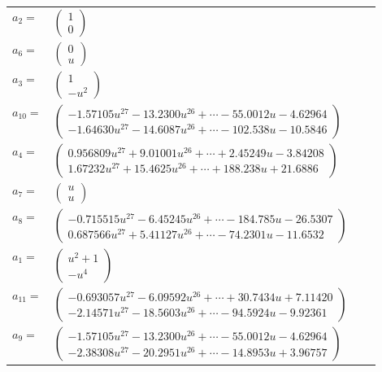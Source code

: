 \documentclass[1p]{elsarticle_modified}
\theoremstyle{definition}
\begin{document}
\begin{tabular}{m{7pt} m{180pt} m{7pt} m{180pt} }
\flushright $a_{2}=$&$\begin{pmatrix}1\\0\end{pmatrix}$ \\
\flushright $a_{6}=$&$\begin{pmatrix}0\\u\end{pmatrix}$ \\
\flushright $a_{3}=$&$\begin{pmatrix}1\\- u^2\end{pmatrix}$ \\
\flushright $a_{10}=$&$\begin{pmatrix}-1.57105 u^{27}-13.2300 u^{26}+\cdots-55.0012 u-4.62964\\-1.64630 u^{27}-14.6087 u^{26}+\cdots-102.538 u-10.5846\end{pmatrix}$ \\
\flushright $a_{4}=$&$\begin{pmatrix}0.956809 u^{27}+9.01001 u^{26}+\cdots+2.45249 u-3.84208\\1.67232 u^{27}+15.4625 u^{26}+\cdots+188.238 u+21.6886\end{pmatrix}$ \\
\flushright $a_{7}=$&$\begin{pmatrix}u\\u\end{pmatrix}$ \\
\flushright $a_{8}=$&$\begin{pmatrix}-0.715515 u^{27}-6.45245 u^{26}+\cdots-184.785 u-26.5307\\0.687566 u^{27}+5.41127 u^{26}+\cdots-74.2301 u-11.6532\end{pmatrix}$ \\
\flushright $a_{1}=$&$\begin{pmatrix}u^2+1\\- u^4\end{pmatrix}$ \\
\flushright $a_{11}=$&$\begin{pmatrix}-0.693057 u^{27}-6.09592 u^{26}+\cdots+30.7434 u+7.11420\\-2.14571 u^{27}-18.5603 u^{26}+\cdots-94.5924 u-9.92361\end{pmatrix}$ \\
\flushright $a_{9}=$&$\begin{pmatrix}-1.57105 u^{27}-13.2300 u^{26}+\cdots-55.0012 u-4.62964\\-2.38308 u^{27}-20.2951 u^{26}+\cdots-14.8953 u+3.96757\end{pmatrix}$ \\

\end{tabular}
\end{document}
